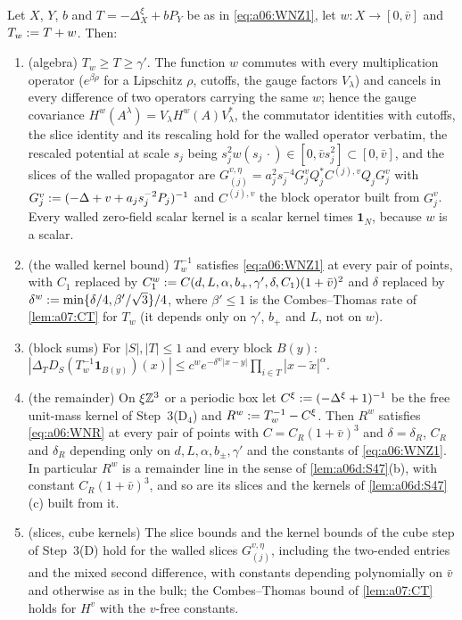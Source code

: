 \begin{lemma}\label{lem:a06:WN1}
Let $X$, $Y$, $b$ and $T=-\Delta^\xi_X+bP_Y$ be as in \eqref{eq:a06:WNZ1}, let $w\colon X\to[0,\bar v]$ and $T_w:= T+w$. Then:
\begin{enumerate}[label=\textup{(\alph*)},nosep,leftmargin=*]
\item\textup{(algebra)} $T_w\ge T\ge\gamma'$. The function $w$ commutes with every multiplication operator ($e^{\beta\rho}$ for a Lipschitz $\rho$, cutoffs, the gauge factors $V_\lambda$) and cancels in every difference of two operators carrying the same $w$; hence the gauge covariance $H^w(A^\lambda)=V_\lambda H^w(A)V_\lambda^*$, the commutator identities with cutoffs, the slice identity \cite[(2.6)]{Ba3} and its rescaling hold for the walled operator verbatim, the rescaled potential at scale $s_j$ being $s_j^2w(s_j\,\cdot)\in[0,\bar v s_j^2]\subset[0,\bar v]$, and the slices of the walled propagator are $G^{v,\eta}_{(j)}=a_j^2s_j^{-4}G^v_jQ_j^*C^{(j),v}Q_jG^v_j$ with $G^v_j:=(-\Delta+v+a_js_j^{-2}P_j)^{-1}$ and $C^{(j),v}$ the block operator built from $G^v_j$. Every walled zero-field scalar kernel is a scalar kernel times $\mathbf 1_N$, because $w$ is a scalar.
\item\textup{(the walled kernel bound)} $T_w^{-1}$ satisfies \eqref{eq:a06:WNZ1} at every pair of points, with $C_1$ replaced by $C_1^w:= C(d,L,\alpha,b_+,\gamma',\delta,C_1)(1+\bar v)^2$ and $\delta$ replaced by $\delta^w:=\min\{\delta/4,\beta'/\sqrt3\}/4$, where $\beta'\le1$ is the Combes--Thomas rate of \cref{lem:a07:CT} for $T_w$ (it depends only on $\gamma'$, $b_+$ and $L$, not on $w$).
\item\textup{(block sums)} For $|S|,|T|\le1$ and every block $B(y)$: $|\Delta_TD_S(T_w^{-1}\mathbf 1_{B(y)})(x)|\le c^we^{-\delta^w|x-y|}\prod_{i\in T}|x-\tilde x|^\alpha$.
\item\textup{(the remainder)} On $\xi\mathbb Z^3$ or a periodic box let $C^\xi:=(-\Delta^\xi+1)^{-1}$ be the free unit-mass kernel of Step~3(D$_4$) and $R^w:= T_w^{-1}-C^\xi$. Then $R^w$ satisfies \eqref{eq:a06:WNR} at every pair of points with $C=C_R(1+\bar v)^3$ and $\delta=\delta_R$, $C_R$ and $\delta_R$ depending only on $d,L,\alpha,b_\pm,\gamma'$ and the constants of \eqref{eq:a06:WNZ1}. In particular $R^w$ is a remainder line in the sense of \cref{lem:a06d:S47}(b), with constant $C_R(1+\bar v)^3$, and so are its slices and the kernels of \cref{lem:a06d:S47}(c) built from it.
\item\textup{(slices, cube kernels)} The slice bounds \cite[(2.10)--(2.12)]{Ba3} and the kernel bounds of the cube step of Step~3(D) hold for the walled slices $G^{v,\eta}_{(j)}$, including the two-ended entries and the mixed second difference, with constants depending polynomially on $\bar v$ and otherwise as in the bulk; the Combes--Thomas bound of \cref{lem:a07:CT} holds for $H^v$ with the $v$-free constants.

\end{enumerate}
\end{lemma}
